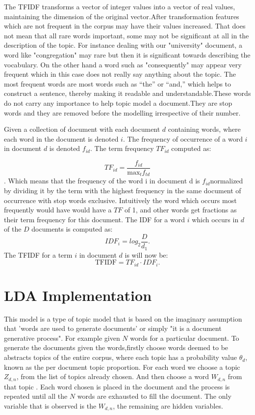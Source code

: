 \begin{flushleft}
The TFIDF transforms a vector of integer values into a vector of real values, maintaining the dimension of the original vector.After transformation  features which are not frequent in the corpus may have their values increased. That does not mean that  all rare words important, some may not be significant at all in the description of the topic.
For instance dealing with our "university" document, a word like "congregation" may rare but then it is significant towards describing the vocabulary. On the other hand a word such as "consequently" may appear very frequent which in this case does not really say anything about the topic. The most frequent words are
most words such as “the” or “and,” which helps to construct a sentence, thereby making it readable and understandable.These words do not carry any importance to help topic model a document.They are stop words and they are removed before the modelling irrespective of their number.
\end{flushleft}
 Given a collection of document with each document $d$ containing words, where each word in the document is denoted $i$. The frequency of occurrence of a word $i$ in document $d$ is denoted $f_{id}$. The term frequency $TF_{id}$ computed as:
 
$$TF_{id}=\frac{f_{id}}{\text{max}_tf_{td}}$$.
Which means that the  frequency of the word  i in document d is $f_{id }$normalized by dividing
it by the term with the highest frequency in the same document of occurrence with stop words exclusive.
Intuitively the word which occurs most frequently would have  would have a $TF$ of 1,
and other words get fractions as their term frequency for this document.
The IDF for a word $i$ which occurs in $d$ of the $D$ documents is computed as:
$$IDF_i=log_2\frac{D}{d_1}\text{.}$$
The TFIDF for a term $i$ in document $d$ is will now be:
$$\text{TFIDF}=TF_{id}\cdot IDF_i \text{.}$$
\section{LDA Implementation}
This model is a type of topic model that is based on the imaginary  assumption that 'words are used to generate documents' or simply "it is a document generative process".
For example given $N$ words for a particular document. To generate the documents given the words,firstly choose words deemed to be abstracts topics of  the entire corpus, where each topic has a probability  value $ \theta_d $, known as the per document topic proportion. For each word  we choose a topic $ Z_{d,n} $, from the list of topics already chosen. And then choose a word $ W_{d,n} $ from that topic . Each word chosen is placed in the document and the process is repeated until all the $ N $ words are exhausted to fill the document. The only variable that is observed is the $ W_{d,n} $, the remaining are hidden variables.


